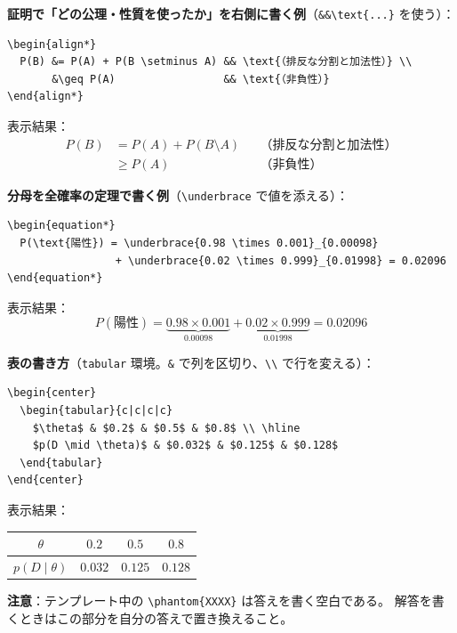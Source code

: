 \documentclass[a4paper,dvipdfmx]{jsarticle}
\newcommand{\提出期限}{2026年11月9日（月）}
\newcommand{\学籍番号}{0000000}
\newcommand{\氏名}{氏名を書く}
\newcommand{\提出日}{2026年11月9日}
\begin{document}
\noindent
\textbf{証明で「どの公理・性質を使ったか」を右側に書く例}（\verb|&&\text{...}| を使う）：
\begin{verbatim}
\begin{align*}
  P(B) &= P(A) + P(B \setminus A) && \text{（排反な分割と加法性）} \\
       &\geq P(A)                 && \text{（非負性）}
\end{align*}
\end{verbatim}
表示結果：
\begin{align*}
  P(B) &= P(A) + P(B \setminus A) && \text{（排反な分割と加法性）} \\
       &\geq P(A)                 && \text{（非負性）}
\end{align*}

\noindent
\textbf{分母を全確率の定理で書く例}（\verb|\underbrace| で値を添える）：
\begin{verbatim}
\begin{equation*}
  P(\text{陽性}) = \underbrace{0.98 \times 0.001}_{0.00098}
                 + \underbrace{0.02 \times 0.999}_{0.01998} = 0.02096
\end{equation*}
\end{verbatim}
表示結果：
\begin{equation*}
  P(\text{陽性}) = \underbrace{0.98 \times 0.001}_{0.00098}
                 + \underbrace{0.02 \times 0.999}_{0.01998} = 0.02096
\end{equation*}

\noindent
\textbf{表の書き方}（\verb|tabular| 環境。\verb|&| で列を区切り、\verb|\\| で行を変える）：
\begin{verbatim}
\begin{center}
  \begin{tabular}{c|c|c|c}
    $\theta$ & $0.2$ & $0.5$ & $0.8$ \\ \hline
    $p(D \mid \theta)$ & $0.032$ & $0.125$ & $0.128$
  \end{tabular}
\end{center}
\end{verbatim}
表示結果：
\begin{center}
  \begin{tabular}{c|c|c|c}
    $\theta$ & $0.2$ & $0.5$ & $0.8$ \\ \hline
    $p(D \mid \theta)$ & $0.032$ & $0.125$ & $0.128$
  \end{tabular}
\end{center}

\noindent
\textbf{注意}：テンプレート中の \verb|\phantom{XXXX}| は答えを書く空白である。
解答を書くときはこの部分を自分の答えで置き換えること。
\end{document}
